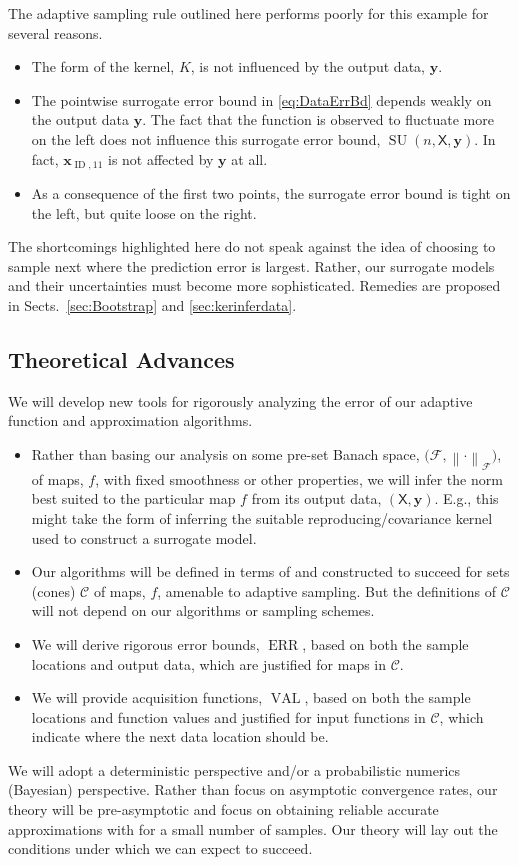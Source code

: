 \documentclass[11pt]{NSFamsart}
\DeclareMathOperator{\ERR}{ERR}
\DeclareMathOperator{\VAL}{VAL}
\DeclareMathOperator{\ID}{ID}
\DeclareMathOperator{\SURRERR}{SU}
\newcommand{\mX}{\mathsf{X}}
\newcommand{\bx}{{\boldsymbol{x}}}
\newcommand{\by}{{\boldsymbol{y}}}
\newcommand{\calc}{{\mathcal{C}}}
\newcommand{\calf}{{\mathcal{F}}}
\newcommand{\norm}[2][{}]{\ensuremath{\left \lVert #2 \right \rVert}_{#1}}
\begin{document}
The adaptive sampling rule outlined here performs poorly for this example for several reasons.
\begin{itemize}
    \item The form of the kernel, $K$, is not influenced by the output data, $\by$.
    
    \item The pointwise surrogate error bound in \eqref{eq:DataErrBd} depends weakly on the output data $\by$.  The fact that the function is observed to fluctuate more on the left does not influence this surrogate error bound, $\SURRERR(n,\mX,\by)$.  In fact, $\bx_{\ID,11}$ is not affected by $\by$ at all.
    
    \item As a consequence of the first two points, the surrogate error bound is tight on the left, but quite loose on the right. 
\end{itemize}
The shortcomings highlighted here do not speak against the idea of choosing to sample next where the prediction error is largest.  Rather, our surrogate models and their uncertainties must become more sophisticated.  Remedies are proposed in Sects.\ \ref{sec:Bootstrap} and \ref{sec:kerinferdata}.


\subsection{Theoretical Advances}
We will develop new tools for rigorously analyzing the error of our adaptive function and approximation algorithms.  
\begin{itemize}
\item Rather than basing our analysis on some pre-set Banach space, $\bigl(\calf,\norm[\calf]{\cdot}\bigr)$, of maps, $f$, with fixed smoothness or other properties, we will infer the norm best suited to the particular map $f$ from its output data, $(\mX,\by)$.  E.g., this might take the form of inferring the suitable reproducing/covariance kernel used to construct a surrogate model. 

\item Our algorithms will be defined in terms of and constructed to succeed for sets (cones) $\calc$ of maps, $f$, amenable to adaptive sampling. But the definitions of $\calc$ will not depend on our algorithms or sampling schemes.

\item We will derive rigorous error bounds, $\ERR$, based on both the sample locations and output data, which are justified for maps in $\calc$. 

\item We will provide  acquisition functions, $\VAL$, based on both the sample locations and function values and justified for input functions in $\calc$, which indicate where the next data location should be.
\end{itemize}
We will adopt a deterministic perspective and/or a probabilistic numerics (Bayesian) perspective.  Rather than focus on asymptotic convergence rates, our theory will be pre-asymptotic and focus on obtaining reliable accurate approximations with for a small number of samples.  Our theory will lay out the conditions under which we can expect to succeed.
\end{document}
